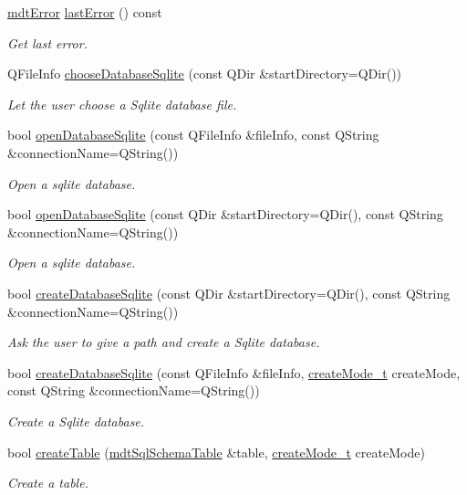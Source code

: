 \begin{DoxyCompactItemize}
\hyperlink{classmdt_error}{mdt\-Error} \hyperlink{classmdt_sql_database_manager_a7fb8458fb9fc10216c8dfbbeb2c3dc50}{last\-Error} () const 
\begin{DoxyCompactList}\small\item\em Get last error. \end{DoxyCompactList}\item 
Q\-File\-Info \hyperlink{classmdt_sql_database_manager_ae6459276d25c6d3733b284249c1f1ab4}{choose\-Database\-Sqlite} (const Q\-Dir \&start\-Directory=Q\-Dir())
\begin{DoxyCompactList}\small\item\em Let the user choose a Sqlite database file. \end{DoxyCompactList}\item 
bool \hyperlink{classmdt_sql_database_manager_a336b722f66e13c5c9b09575642f7b273}{open\-Database\-Sqlite} (const Q\-File\-Info \&file\-Info, const Q\-String \&connection\-Name=Q\-String())
\begin{DoxyCompactList}\small\item\em Open a sqlite database. \end{DoxyCompactList}\item 
bool \hyperlink{classmdt_sql_database_manager_a536f140060edf7721d8f0589f4d7de0d}{open\-Database\-Sqlite} (const Q\-Dir \&start\-Directory=Q\-Dir(), const Q\-String \&connection\-Name=Q\-String())
\begin{DoxyCompactList}\small\item\em Open a sqlite database. \end{DoxyCompactList}\item 
bool \hyperlink{classmdt_sql_database_manager_ac9c9cac0342cc3a66e4c3510da8f97c9}{create\-Database\-Sqlite} (const Q\-Dir \&start\-Directory=Q\-Dir(), const Q\-String \&connection\-Name=Q\-String())
\begin{DoxyCompactList}\small\item\em Ask the user to give a path and create a Sqlite database. \end{DoxyCompactList}\item 
bool \hyperlink{classmdt_sql_database_manager_ae2c4622505d90610d3990dd682662678}{create\-Database\-Sqlite} (const Q\-File\-Info \&file\-Info, \hyperlink{classmdt_sql_database_manager_a2f5b46d67a88095053a5edfc415c7418}{create\-Mode\-\_\-t} create\-Mode, const Q\-String \&connection\-Name=Q\-String())
\begin{DoxyCompactList}\small\item\em Create a Sqlite database. \end{DoxyCompactList}\item 
bool \hyperlink{classmdt_sql_database_manager_afe78562023f6b8d530a24a9362587ed5}{create\-Table} (\hyperlink{classmdt_sql_schema_table}{mdt\-Sql\-Schema\-Table} \&table, \hyperlink{classmdt_sql_database_manager_a2f5b46d67a88095053a5edfc415c7418}{create\-Mode\-\_\-t} create\-Mode)
\begin{DoxyCompactList}\small\item\em Create a table. \end{DoxyCompactList}\end{DoxyCompactItemize}



